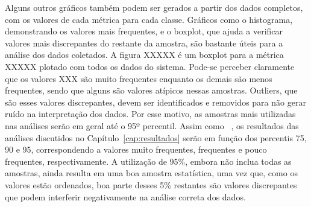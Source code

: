 Alguns outros gráficos também podem ser gerados a partir dos dados completos, com os valores de cada métrica para cada classe. Gráficos como o histograma, demonstrando os valores mais frequentes, e o boxplot, que ajuda a verificar valores mais discrepantes do restante da amostra, são bastante úteis para a análise dos dados coletados. A figura XXXXX é um boxplot para a métrica XXXXX plotado com todos os dados do sistema. Pode-se perceber claramente que os valores XXX são muito frequentes enquanto os demais são menos frequentes, sendo que alguns são valores atípicos nessas amostras. Outliers, que são esses valores discrepantes, devem ser identificados e removidos para não gerar ruído na interpretação dos dados. Por esse motivo, as amostras mais utilizadas nas análises serão em geral até o 95º percentil. Assim como ~, os resultados das análises discutidos no Capítulo~\ref{cap:resultados} serão em função dos percentis 75, 90 e 95, correspondendo a valores muito frequentes, frequentes e pouco frequentes, respectivamente. A utilização de 95\%, embora não inclua todas as amostras, ainda resulta em uma boa amostra estatística, uma vez que, como os valores estão ordenados, boa parte desses 5\% restantes são valores discrepantes que podem interferir negativamente na análise correta dos dados.


